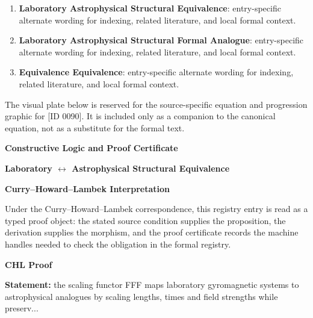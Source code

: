 \begingroup\footnotesize\sloppy
\begin{enumerate}[leftmargin=1.35em,itemsep=1pt,topsep=1pt,parsep=0pt]
\item \textbf{Laboratory Astrophysical Structural Equivalence}: entry-specific alternate wording for indexing, related literature, and local formal context.
\item \textbf{Laboratory Astrophysical Structural Formal Analogue}: entry-specific alternate wording for indexing, related literature, and local formal context.
\item \textbf{Equivalence Equivalence}: entry-specific alternate wording for indexing, related literature, and local formal context.
\end{enumerate}
\endgroup

\begingroup\footnotesize\sloppy
The visual plate below is reserved for the source-specific equation and progression graphic for [ID 0090]. It is included only as a companion to the canonical equation, not as a substitute for the formal text.
\par\endgroup
\ifTZPDarkEdition
{}
\fi

\clearpage
\begingroup\tzpsupportsetup
\noindent\textbf{\fontsize{10.8pt}{12.8pt}\selectfont [ID 0090] Constructive Logic and Proof Certificate}\par
\noindent\textbf{\fontsize{10pt}{12pt}\selectfont Laboratory $\leftrightarrow$ Astrophysical Structural Equivalence}\par
\vspace{0.45em}
\begingroup
\footnotesize
\setlength{\parskip}{0.22em}
\setlength{\parindent}{0pt}
\noindent\textbf{Curry--Howard--Lambek Interpretation}\par
Under the Curry--Howard--Lambek correspondence, this registry entry is read as a typed proof
object: the stated source condition supplies the proposition, the derivation supplies the
morphism, and the proof certificate records the machine handles needed to check the obligation
in the formal registry.

\vspace{0.45em}
\noindent\textbf{CHL Proof}\par
\textbf{Statement:} the scaling functor FFF maps laboratory gyromagnetic systems to astrophysical analogues
by scaling lengths, times and field strengths while preserv...

